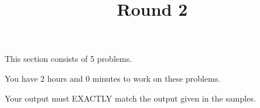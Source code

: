 \documentclass{../codeproblem}
\begin{document}
\title{Round 2}
This section consists of 5 problems.

You have 2 hours and 0 minutes to work on these problems.

Your output must EXACTLY match the output given in the samples.






\end{document}
